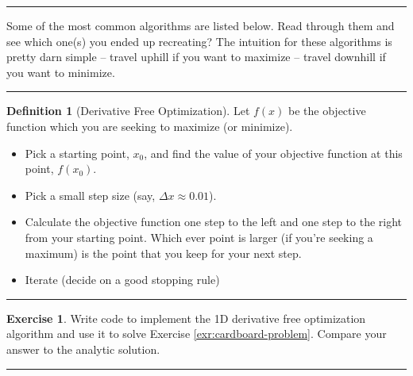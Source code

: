 \documentclass[
]{book}
\theoremstyle{definition}
\newtheorem{definition}{Definition}[chapter]
\theoremstyle{definition}
\theoremstyle{definition}
\newtheorem{exercise}{Exercise}[chapter]
\theoremstyle{remark}
\begin{document}
\begin{center}\rule{0.5\linewidth}{0.5pt}\end{center}

Some of the most common algorithms are listed below. Read through them and see which one(s) you ended up recreating? The intuition for these algorithms is pretty darn simple -- travel uphill if you want to maximize -- travel downhill if you want to minimize.

\begin{center}\rule{0.5\linewidth}{0.5pt}\end{center}

\begin{definition}[Derivative Free Optimization]
\protect\hypertarget{def:unnamed-chunk-192}{}{\label{def:unnamed-chunk-192} {} }Let \(f(x)\) be the objective function which you are seeking to maximize
(or minimize).

\begin{itemize}
\item
  Pick a starting point, \(x_0\), and find the value of your objective
  function at this point, \(f(x_0)\).
\item
  Pick a small step size (say, \(\Delta x \approx 0.01\)).
\item
  Calculate the objective function one step to the left and one step
  to the right from your starting point. Which ever point is larger
  (if you're seeking a maximum) is the point that you keep for your
  next step.
\item
  Iterate (decide on a good stopping rule)
\end{itemize}
\end{definition}

\begin{center}\rule{0.5\linewidth}{0.5pt}\end{center}

\begin{exercise}
\protect\hypertarget{exr:unnamed-chunk-193}{}{\label{exr:unnamed-chunk-193} }Write code to implement the 1D derivative free optimization algorithm and use it to solve Exercise \ref{exr:cardboard-problem}. Compare your answer to the analytic solution.
\end{exercise}

\begin{center}\rule{0.5\linewidth}{0.5pt}\end{center}
\end{document}
